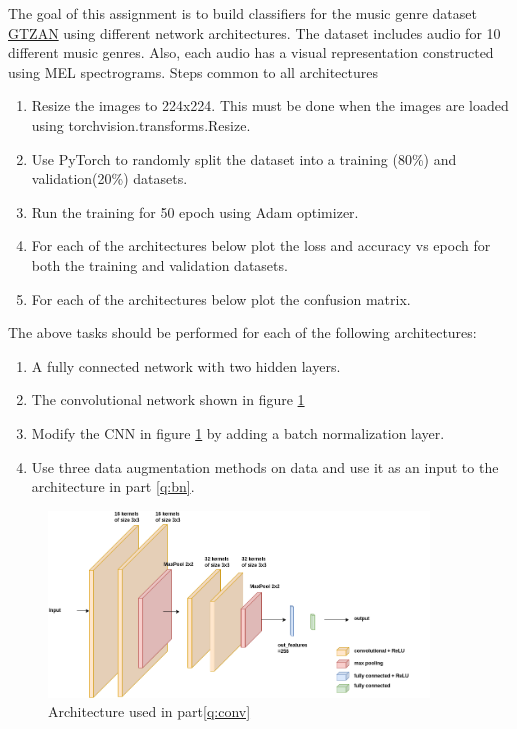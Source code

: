 \documentclass{article}
\begin{document}
The goal of this assignment is to build classifiers for the music genre dataset \href{https://www.kaggle.com/datasets/andradaolteanu/gtzan-dataset-music-genre-classification}{GTZAN} using different network architectures.
The dataset includes audio for 10 different music genres. Also, each audio has a visual representation constructed using MEL spectrograms.
Steps common to all architectures
\begin{enumerate}
    \item Resize the images to 224x224. This must be done when the images are loaded using torchvision.transforms.Resize. 
    \item Use PyTorch to randomly split the dataset into a training (80\%) and validation(20\%) datasets.
    \item Run the training for 50 epoch using Adam optimizer.
    \item For each of the architectures below plot the loss and accuracy vs epoch for both the training and validation datasets.
    \item For each of the architectures below plot the confusion matrix.
\end{enumerate}
The above tasks should be performed for each of the following architectures:
\begin{enumerate}[label=\Alph*]
    \item A fully connected network with two hidden layers\label{q:fc}.
    \item\label{q:conv} The convolutional network shown in figure \ref{fig:conv}
    \item Modify the CNN in figure \ref{fig:conv} by adding a batch normalization layer\label{q:bn}.
    \item Use three data augmentation methods on data and use it as an input to the architecture in part \ref{q:bn}\label{q:da}.
    
\end{enumerate} 
\begin{figure}[h]
    \begin{center}
        \includegraphics[width=0.9\textwidth]{course-work-conv.png}
    \end{center}
    \caption{Architecture used in part\ref{q:conv}\label{fig:conv}    }
\end{figure}
\end{document}

